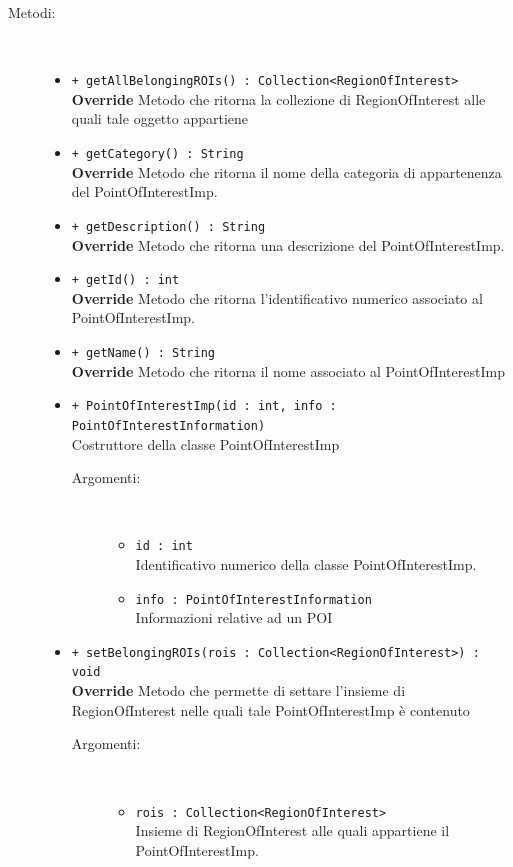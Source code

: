\documentclass[../DefinizioneDiProdotto.tex]{subfiles}
\begin{document}
\begin{description}
\begin{itemize}
\end{itemize}
\item[Metodi:] \
\begin{itemize}
\item \texttt{+ getAllBelongingROIs() : Collection<RegionOfInterest>}\\
\textbf{Override} Metodo che ritorna la collezione di RegionOfInterest alle quali tale oggetto appartiene
 \item \texttt{+ getCategory() : String}\\
\textbf{Override} Metodo che ritorna il nome della categoria di appartenenza del PointOfInterestImp.
 \item \texttt{+ getDescription() : String}\\
\textbf{Override} Metodo che ritorna una descrizione del PointOfInterestImp.
 \item \texttt{+ getId() : int}\\
\textbf{Override} Metodo che ritorna l'identificativo numerico associato al PointOfInterestImp.
 \item \texttt{+ getName() : String}\\
\textbf{Override} Metodo che ritorna il nome associato al PointOfInterestImp
 \item \texttt{+ PointOfInterestImp(id  : int, info : PointOfInterestInformation)}\\
Costruttore della classe PointOfInterestImp
 \begin{description}
\item[Argomenti:] \
\begin{itemize}
\item \texttt{id  : int}\\
Identificativo numerico della classe PointOfInterestImp.\item \texttt{info : PointOfInterestInformation}\\
Informazioni relative ad un POI\end{itemize}
\end{description}
\item \texttt{+ setBelongingROIs(rois : Collection<RegionOfInterest>) : void}\\
\textbf{Override} Metodo che permette di settare l'insieme di RegionOfInterest nelle quali tale PointOfInterestImp è contenuto
 \begin{description}
\item[Argomenti:] \
\begin{itemize}
\item \texttt{rois : Collection<RegionOfInterest>}\\
Insieme di RegionOfInterest alle quali appartiene il PointOfInterestImp.\end{itemize}
\end{description}
\end{itemize}
\end{description}
\end{document}
